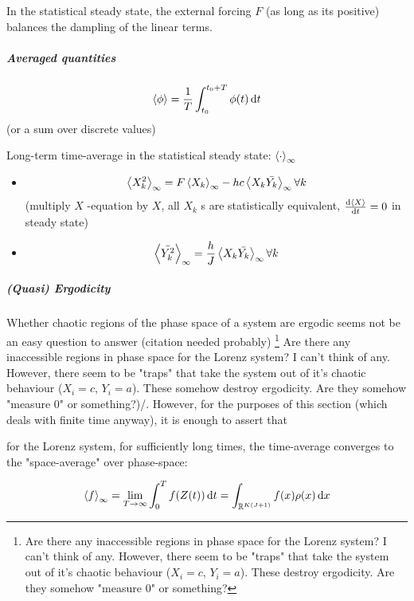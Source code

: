 \documentclass[11pt]{article}
\newcommand{\R}{{\mathbb{R}}}
\begin{document}
In the statistical steady state, the external forcing \(F\) (as long as its positive) balances
the dampling of the linear terms.

\subparagraph{Averaged quantities}
\label{sec:orga5e057e}

$$\expval{\phi} = \frac{1}{T} \int_{t_0}^{t_0 + T} \phi(t) \dd{t}$$ (or a sum over discrete values)

Long-term time-average in the statistical steady state: \(\expval{\cdot}_{\infty}\)

\begin{itemize}
\item \begin{equation}
\label{eqn:equilibrium_X}
   \expval{X_k^2}_\infty = F \expval{X_k}_{\infty} - hc \expval{X_k\bar{Y_k}}_\infty \forall k
\end{equation}
(multiply \(X\) -equation by \(X\), all \(X_k\) s are statistically equivalent, \(\dv{\expval{X}}{t} = 0\) in steady state)
\item \begin{equation}
\label{eqn:equilibrium_Y}
  \expval{\bar{Y_k^2}}_{\infty} = \frac{h}{J} \expval{X_k \bar{Y_k}}_{\infty} \forall k
\end{equation}
\end{itemize}

\subparagraph{(Quasi) Ergodicity}
\label{sec:orgb1a8393}

Whether chaotic regions of the phase space of a system are ergodic seems not be an easy question
to answer (citation needed probably) \footnote{Are there any inaccessible regions in phase space
for the Lorenz system? I can't think of any. However, there seem to be "traps" that take the
system out of it's chaotic behaviour (\(X_i = c\), \(Y_i=a\)). These destroy ergodicity.
Are they somehow "measure 0" or something?} Are there any inaccessible regions in phase space
for the Lorenz system? I can't think of any. However, there seem to be "traps" that take the
system out of it's chaotic behaviour (\(X_i = c\), \(Y_i=a\)). These somehow destroy ergodicity.
Are they somehow "measure 0" or something?)/. However, for the purposes of this section (which deals with
finite time anyway), it is enough to assert that

for the Lorenz system, for sufficiently long times, the time-average converges to the
"space-average" over phase-space:

\begin{equation}
\label{eqn:lorenz_ergodicity}
   \expval{f}_{\infty} = \lim_{T \to \infty} \int_0^T f(Z(t)) \dd{t} = \int_{\R^{K(J+1)}} f(x) \rho(x) \dd{x}
\end{equation}
\end{document}
